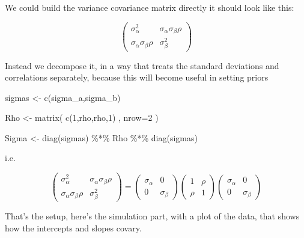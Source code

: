 \documentclass[
]{book}
\newenvironment{Shaded}{\begin{snugshade}}{\end{snugshade}}
\newcommand{\AttributeTok}[1]{\textcolor[rgb]{0.77,0.63,0.00}{#1}}
\newcommand{\DecValTok}[1]{\textcolor[rgb]{0.00,0.00,0.81}{#1}}
\newcommand{\FunctionTok}[1]{\textcolor[rgb]{0.00,0.00,0.00}{#1}}
\newcommand{\NormalTok}[1]{#1}
\newcommand{\OtherTok}[1]{\textcolor[rgb]{0.56,0.35,0.01}{#1}}
\newcommand{\SpecialCharTok}[1]{\textcolor[rgb]{0.00,0.00,0.00}{#1}}
\begin{document}
We could build the variance covariance matrix directly it should look like this:

\[
\begin{pmatrix}
\sigma_\alpha^2 & \sigma_\alpha \sigma_\beta \rho \\
\sigma_\alpha \sigma_\beta \rho & \sigma_\beta^2 
\end{pmatrix}
\]

Instead we decompose it, in a way that treats the standard deviations and correlations separately, because this will become useful in setting priors

\begin{Shaded}
\begin{Highlighting}[]
\NormalTok{sigmas }\OtherTok{\textless{}{-}} \FunctionTok{c}\NormalTok{(sigma\_a,sigma\_b)  }

\NormalTok{Rho }\OtherTok{\textless{}{-}} \FunctionTok{matrix}\NormalTok{( }\FunctionTok{c}\NormalTok{(}\DecValTok{1}\NormalTok{,rho,rho,}\DecValTok{1}\NormalTok{) , }\AttributeTok{nrow=}\DecValTok{2}\NormalTok{ ) }

\NormalTok{Sigma }\OtherTok{\textless{}{-}} \FunctionTok{diag}\NormalTok{(sigmas) }\SpecialCharTok{\%*\%}\NormalTok{ Rho }\SpecialCharTok{\%*\%} \FunctionTok{diag}\NormalTok{(sigmas)}
\end{Highlighting}
\end{Shaded}

i.e.

\[
\begin{pmatrix}
\sigma_\alpha^2 & \sigma_\alpha \sigma_\beta \rho \\
\sigma_\alpha \sigma_\beta \rho & \sigma_\beta^2 
\end{pmatrix}
=
\begin{pmatrix}
\sigma_\alpha & 0 \\
0 & \sigma_\beta 
\end{pmatrix}
\begin{pmatrix}
1 &  \rho \\
 \rho & 1 
\end{pmatrix}
\begin{pmatrix}
\sigma_\alpha & 0 \\
0 & \sigma_\beta 
\end{pmatrix}
\]

That's the setup, here's the simulation part, with a plot of the data, that shows how the intercepts and slopes covary.
\end{document}
